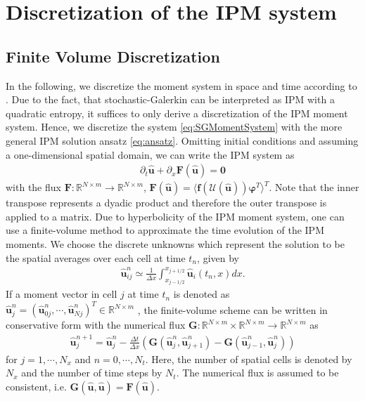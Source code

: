 \section{Discretization of the IPM system}
\label{sec:framework}
\subsection{Finite Volume Discretization}
In the following, we discretize the moment system in space and time according to \cite{kusch2017maximum}. Due to the fact, that stochastic-Galerkin can be interpreted as IPM with a quadratic entropy, it suffices to only derive a discretization of the IPM moment system. Hence, we discretize the system \eqref{eq:SGMomentSystem} with the more general IPM solution ansatz \eqref{eq:ansatz}.  
Omitting initial conditions and assuming a one-dimensional spatial domain, we can write the IPM system  as
\begin{align*}
\partial_t \bm{\hat u}+\partial_x \bm{F}(\bm{\hat u}) = \bm{0}
\end{align*}
with the flux $\bm{F}:\mathbb{R}^{N\times m}\to\mathbb{R}^{N\times m}$, $\bm{F}(\bm{\hat u})=\langle \bm f(\mathcal{U}(\bm{\hat u}))\bm{\varphi}^T \rangle^T$. Note that the inner transpose represents a dyadic product and therefore the outer transpose is applied to a matrix. Due to hyperbolicity of the IPM moment system, one can use a finite-volume method to approximate the time evolution of the IPM moments. We choose the discrete unknowns which represent the solution to be the spatial averages over each cell at time $t_n$, given by
\begin{align*}
\bm{\hat u}_{ij}^n \simeq \frac{1}{\Delta x}\int_{x_{j-1/ 2}}^{x_{j+1/ 2}}\bm{\hat u}_i(t_n,x) dx.
\end{align*}
If a moment vector in cell $j$ at time $t_n$ is denoted as $\bm{\hat u}_j^n = (\bm{\hat u}_{0j}^n,\cdots,\bm{\hat u}_{Nj}^n)^T\in\mathbb{R}^{N\times m}$ , the finite-volume scheme can be written in conservative form with the numerical flux $\bm{G}:\mathbb{R}^{N\times m}\times\mathbb{R}^{N\times m}\to\mathbb{R}^{N\times m}$ as
\begin{align}\label{eq:IPMDiscretization}
\bm{\hat u}_{j}^{n+1} = \bm{\hat u}_{j}^{n}  - \frac{\Delta t}{\Delta x}\left( \bm{G}(\bm{\hat u}_{j}^{n},\bm{\hat u}_{j+1}^{n})- \bm{G}(\bm{\hat u}_{j-1}^{n},\bm{\hat u}_{j}^{n})\right)
\end{align}
for $j = 1,\cdots,N_x$ and $n = 0,\cdots,N_t$. Here, the number of spatial cells is denoted by $N_x$ and the number of time steps by $N_t$.
The numerical flux is assumed to be consistent, i.e. $\bm{G}(\bm{\hat{u}},\bm{\hat{u}})=\bm{F}(\bm{\hat{u}})$.


